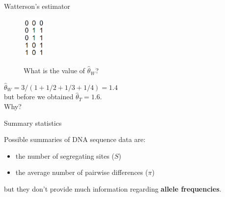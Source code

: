 \begin{frame}{Watterson's estimator}

        \begin{figure}
                \includegraphics[width=0.1\textwidth]{Pics/sequences01_only} \\
                \caption{What is the value of $\hat{\theta}_W$?}
        \end{figure}

        \pause
        $\hat{\theta}_W = 3 / (1+1/2+1/3+1/4)=1.4$ \\
	but before we obtained $\hat{\theta}_T=1.6$. \\
	Why?
	
\end{frame}


\begin{frame}{Summary statistics}

	Possible summaries of DNA sequence data are:
	\begin{itemize}
		\item the number of segregating sites ($S$)
		\item the average number of pairwise differences ($\pi$)
	\end{itemize}
	but they don't provide much information regarding \textbf{allele frequencies}.

\end{frame}


